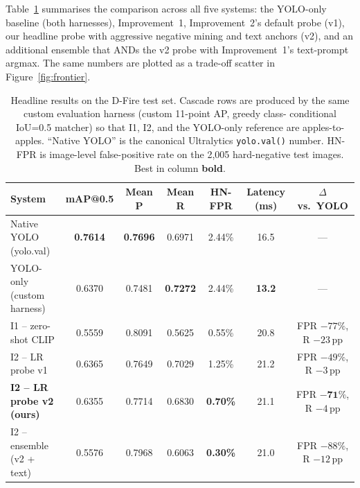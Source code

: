 \documentclass{article}
\begin{document}
Table~\ref{tab:headline} summarises the comparison across all five systems:
the YOLO-only baseline (both harnesses), Improvement~1, Improvement~2's
default probe (v1), our headline probe with aggressive negative mining and
text anchors (v2), and an additional ensemble that ANDs the v2 probe with
Improvement~1's text-prompt argmax. The same numbers are plotted as a
trade-off scatter in Figure~\ref{fig:frontier}.

\begin{table}[t]
\caption{Headline results on the D-Fire test set. Cascade rows are produced
by the same custom evaluation harness (custom 11-point AP, greedy class-
conditional IoU=0.5 matcher) so that I1, I2, and the YOLO-only reference are
apples-to-apples. ``Native YOLO'' is the canonical Ultralytics
\texttt{yolo.val()} number. HN-FPR is image-level false-positive rate on the
2{,}005 hard-negative test images. Best in column \textbf{bold}.}
\label{tab:headline}
\vskip 0.10in
\begin{center}
\begin{small}
\begin{tabular}{lcccccc}
\toprule
\textbf{System} & \textbf{mAP@0.5} & \textbf{Mean P} & \textbf{Mean R} & \textbf{HN-FPR} & \textbf{Latency (ms)} & \textbf{$\Delta$ vs.\ YOLO} \\
\midrule
Native YOLO (yolo.val)              & \textbf{0.7614} & \textbf{0.7696} & 0.6971       & 2.44\% & 16.5 & --- \\
YOLO-only (custom harness)          & 0.6370          & 0.7481          & \textbf{0.7272} & 2.44\% & \textbf{13.2} & --- \\
\midrule
I1 -- zero-shot CLIP                & 0.5559          & 0.8091          & 0.5625       & 0.55\% & 20.8 & FPR $-77\%$, R $-23$\,pp \\
I2 -- LR probe v1                   & 0.6365          & 0.7649          & 0.7029       & 1.25\% & 21.2 & FPR $-49\%$, R $-3$\,pp \\
\textbf{I2 -- LR probe v2 (ours)}   & 0.6355          & 0.7714          & 0.6830       & \textbf{0.70\%} & 21.1 & FPR $\bm{-71\%}$, R $-4$\,pp \\
I2 -- ensemble (v2 + text)          & 0.5576          & 0.7968          & 0.6063       & \textbf{0.30\%} & 21.0 & FPR $-88\%$, R $-12$\,pp \\
\bottomrule
\end{tabular}
\end{small}
\end{center}
\vskip -0.15in
\end{table}
\end{document}
